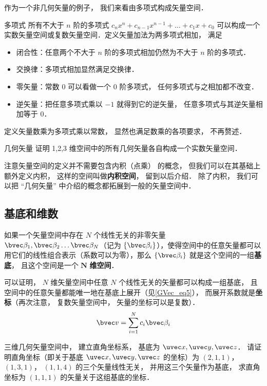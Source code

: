 作为一个非几何矢量的例子， 我们来看由多项式构成矢量空间．

\begin{example}{多项式}\label{LSpace_ex1}
所有不大于 $n$ 阶的多项式 $c_n x^n + c_{n-1} x^{n-1} + \dots + c_1 x + c_0$ 可以构成一个实数矢量空间或复数矢量空间．定义矢量加法为两多项式相加， 满足
\begin{itemize}
\item 闭合性：任意两个不大于 $n$ 阶的多项式相加仍然为不大于 $n$ 阶的多项式．
\item 交换律：多项式相加显然满足交换律．
\item 零矢量：常数 0 可以看做一个 0 阶多项式， 任何多项式与之相加都不改变．
\item 逆矢量：把任意多项式乘以 $-1$ 就得到它的逆矢量， 任意多项式与其逆矢量相加等于 0．
\end{itemize}
定义矢量数乘为多项式乘以常数， 显然也满足数乘的各项要求， 不再赘述．
\end{example}

\begin{exercise}{几何矢量}
证明 1,2,3 维空间中的所有几何矢量各自构成一个实数矢量空间．
\end{exercise}

注意矢量空间的定义并不需要包含内积（点乘） 的概念， 但我们可以在其基础上额外定义内积， 这样的空间叫做\textbf{内积空间}， 留到以后介绍． 除了内积， 我们可以把 “几何矢量” 中介绍的概念都拓展到一般的矢量空间中．

\subsection{基底和维数}

如果一个矢量空间中存在 $N$ 个线性无关的非零矢量 $\bvec \beta_1, \bvec \beta_2 \dots \bvec \beta_N$（记为 $\{\bvec \beta_i\}$），使得空间中的任意矢量都可以用它们的线性组合表示（系数可以为零），那么 $\{\bvec \beta_i\}$ 就是这个空间的一组\textbf{基底}， 且这个空间是一个 $\boldsymbol{N}$ \textbf{维空间}．

可以证明， $N$ 维矢量空间中任意 $N$ 个线性无关的矢量都可以构成一组基底， 且空间中的任意矢量都能唯一地在基底上展开（见\autoref{GVec_eq5}）， 而展开系数就是\textbf{坐标}（再次注意， 复数矢量空间中， 矢量的坐标可以是复数）．
\begin{equation}
\bvec v = \sum_{i=1}^N c_i \bvec \beta_i
\end{equation}

\begin{exercise}{}
三维几何矢量空间中， 建立直角坐标系， 基底为 $\uvec x, \uvec y, \uvec z$． 请证明直角坐标（即关于基底 $\uvec x, \uvec y, \uvec z$ 的坐标）为 $(2, 1, 1)$， $(1, 3, 1)$， $(1, 1, 4)$ 的三个矢量线性无关， 并用这三个矢量作为基底， 求直角坐标为 $(1, 1, 1)$ 的矢量关于这组基底的坐标．
\end{exercise}

